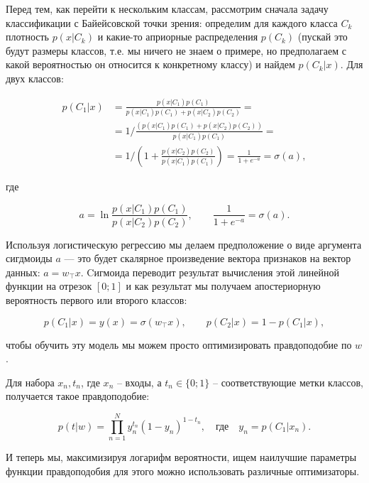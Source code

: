 Перед тем, как перейти к нескольким классам, рассмотрим сначала задачу классификации с Байейсовской точки
зрения: определим для каждого класса $C_k$ плотность $p(x|C_k)$ и какие-то априорные распределения $p(C_k)$
(пускай это будут размеры классов, т.е. мы ничего не знаем о примере, но предполагаем с какой вероятностью он
относится к конкретному классу) и найдем $p(C_k|x)$. Для двух классов:

\begin{equation}
\begin{aligned}
 p(C_1|x) & = \frac{p(x|C_1)p(C_1)}{p(x|C_1)p(C_1)+p(x|C_2)p(C_2)} = \\
 & = 1/\frac{(p(x|C_1)p(C_1)+p(x|C_2)p(C_2))}{p(x|C_1)p(C_1)} = \\
 & = 1/(1+\frac{p(x|C_2)p(C_2)}{p(x|C_1)p(C_1)}) = \frac{1}{1+e^{-a}} = \sigma (a),
\end{aligned}
\end{equation}

где

\begin{equation}
 a = \ln\frac{p(x|C_1)p(C_1)}{p(x|C_2)p(C_2)},\qquad \frac{1}{1+e^{-a}} = \sigma (a).
\end{equation}

Используя логистическую регрессию мы делаем предположение о виде аргумента сигдмоиды $a$ --- это будет
скалярное произведение вектора признаков на вектор данных: $a = w_\top x$. Cигмоида переводит результат
вычисления этой линейной функции на отрезок $[0;1]$ и как результат мы получаем апостериорную вероятность
первого или второго классов:

\begin{equation}
 p(C_1|x) = y(x) = \sigma (w_\top x),\qquad p(C_2|x) = 1-p(C_1|x),
\end{equation}

чтобы обучить эту модель мы можем просто оптимизировать правдоподобие по $w$.

Для набора ${x_n, t_n}$, где $x_n$ -- входы, а $t_n \in \{0;1\}$ -- соответствующие метки классов, получается
такое правдоподобие:

\begin{equation}
 p(t|w) = \prod_{n=1}^N y_n^{t_n}(1-y_n)^{1-t_n},\quad\text{где}\quad y_n = p(C_1|x_n).
\end{equation}

И теперь мы, максимизируя логарифм вероятности, ищем наилучшие параметры функции правдоподобия для этого можно
использовать различные оптимизаторы.

